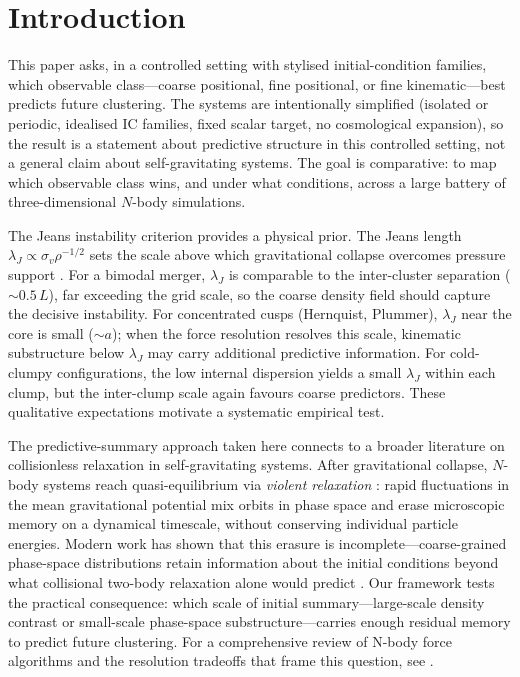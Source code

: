 \documentclass[twocolumn,linenumbers]{aastex701}
\begin{document}


\section{Introduction}
\label{sec:intro}

This paper asks, in a controlled setting with stylised initial-condition
families, which observable class---coarse positional, fine positional, or
fine kinematic---best predicts future clustering.
The systems are intentionally simplified (isolated or periodic, idealised
IC families, fixed scalar target, no cosmological expansion), so the result
is a statement about predictive structure in this controlled setting, not a
general claim about self-gravitating systems.
The goal is comparative: to map which observable class wins, and under what
conditions, across a large battery of three-dimensional $N$-body simulations.

The Jeans instability criterion provides a physical prior.
The Jeans length $\lambda_J \propto \sigma_v \rho^{-1/2}$ sets the
scale above which gravitational collapse overcomes pressure support
\citep{BinneyTremaine2008}.
For a bimodal merger, $\lambda_J$ is comparable to the inter-cluster
separation ($\sim 0.5\,L$), far exceeding the grid scale, so the coarse
density field should capture the decisive instability.
For concentrated cusps (Hernquist, Plummer), $\lambda_J$ near the core
is small ($\sim a$); when the force resolution resolves this scale,
kinematic substructure below $\lambda_J$ may carry additional predictive
information.  For cold-clumpy configurations, the low internal dispersion
yields a small $\lambda_J$ within each clump, but the inter-clump scale
again favours coarse predictors.  These qualitative expectations motivate
a systematic empirical test.

The predictive-summary approach taken here connects to a broader literature
on collisionless relaxation in self-gravitating systems.
After gravitational collapse, $N$-body systems reach quasi-equilibrium via
\textit{violent relaxation} \citep{LyndenBell1967}: rapid fluctuations in
the mean gravitational potential mix orbits in phase space and erase
microscopic memory on a dynamical timescale, without conserving individual
particle energies.
Modern work has shown that this erasure is incomplete---coarse-grained
phase-space distributions retain information about the initial conditions
beyond what collisional two-body relaxation alone would predict
\citep{Chavanis2002}.
Our framework tests the practical consequence: which scale of initial
summary---large-scale density contrast or small-scale phase-space
substructure---carries enough residual memory to predict future clustering.
For a comprehensive review of N-body force algorithms and the resolution
tradeoffs that frame this question, see \citet{DehnenRead2011}.
\end{document}
